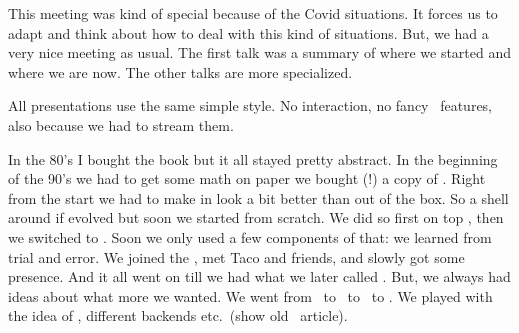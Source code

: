 

\startdocument
  [title={MKII MKIV LMTX},
   banner={where does it end},
   location={context\enspace {\bf 2020}\enspace meeting}]

\starttitle[title=Welcome]

This meeting was kind of special because of the Covid situations. It forces us to
adapt and think about how to deal with this kind of situations. But, we had a
very nice meeting as usual. The first talk was a summary of where we started and
where we are now. The other talks are more specialized.

All presentations use the same simple style. No interaction, no fancy \PDF\
features, also because we had to stream them.

\stoptitle

\starttitle[title=MKII]

\startitemize
\startitem
    In the 80's I bought the \TEX book but it all stayed pretty abstract.
\stopitem
\startitem
    In the beginning of the 90's we had to get some math on paper we bought (!) a
    copy of \LATEX.
\stopitem
\startitem
    Right from the start we had to make in look a bit better than out of the box.
\stopitem
\startitem
    So a shell around if evolved but soon we started from scratch.
\stopitem
\startitem
    We did so first on top \LAMSTEX, then we switched to \INRSTEX.
\stopitem
\startitem
    Soon we only used a few components of that: we learned from trial and error.
\stopitem
\startitem
    We joined the \NTG, met Taco and friends, and slowly got some presence.
\stopitem
\startitem
    And it all went on till we had what we later called \MKII.
\stopitem
\startitem
    But, we always had ideas about what more we wanted.
\stopitem
\startitem
    We went from \TEX\ to \ETEX\ to \PDFTEX\ to \PDFETEX.
\stopitem
\startitem
    We played with the idea of , different backends etc.\ (show old
    \MAPS\ article).
\stopitem
\stopitemize

\stoptitle

\starttitle[title=MK{\thinspace\periods[2]}]

